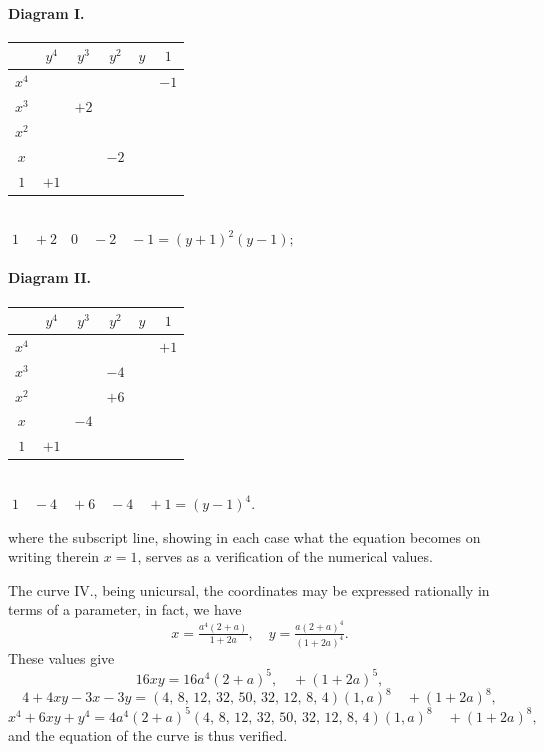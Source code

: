 \documentclass[11pt]{article}
\begin{document}
\paragraph{Diagram I.}
\begin{center}
\renewcommand{\arraystretch}{1.05}
\begin{tabular}{|c|c|c|c|c|c|}
\hline
            & $y^4$ & $y^3$ & $y^2$ & $y$ & $1$ \\
\hline
$x^4$ &       &       &       &      & $-1$ \\
\hline
$x^3$ &       & $+2$ &       &      &      \\
\hline
$x^2$ &       &       &       &      &      \\
\hline
$x$   &       &       & $-2$ &      &      \\
\hline
$1$   & $+1$ &       &       &      &      \\
\hline
\end{tabular}\\[2pt]
\(\;1\quad+2\quad 0\quad-2\quad-1=(y+1)^2(y-1)\!;\)
\end{center}

\paragraph{Diagram II.}
\begin{center}
\renewcommand{\arraystretch}{1.05}
\begin{tabular}{|c|c|c|c|c|c|}
\hline
            & $y^4$ & $y^3$ & $y^2$ & $y$ & $1$ \\
\hline
$x^4$ &       &       &       &      & $+1$ \\
\hline
$x^3$ &       &       & $-4$ &      &      \\
\hline
$x^2$ &       &       & $+6$ &      &      \\
\hline
$x$   &       & $-4$ &       &      &      \\
\hline
$1$   & $+1$ &       &       &      &      \\
\hline
\end{tabular}\\[2pt]
\(\;1\quad-4\quad+6\quad-4\quad+1=(y-1)^4.\)
\end{center}

where the subscript line, showing in each case what the equation becomes on writing
therein $x=1$, serves as a verification of the numerical values.

The curve IV., being unicursal, the coordinates may be expressed rationally in
terms of a parameter, in fact, we have
\[
x=\tfrac{a^4(2+a)}{1+2a},\quad y=\tfrac{a(2+a)^4}{(1+2a)^4}.
\]
These values give
\[
16xy=16a^4(2+a)^5,\quad +(1+2a)^5,
\]
\[
4+4xy-3x-3y=(4,\,8,\,12,\,32,\,50,\,32,\,12,\,8,\,4)(1,a)^8\quad +(1+2a)^8,
\]
\[
x^4+6xy+y^4=4a^4(2+a)^5(4,\,8,\,12,\,32,\,50,\,32,\,12,\,8,\,4)(1,a)^8\quad +(1+2a)^8,
\]
and the equation of the curve is thus verified.
\end{document}
